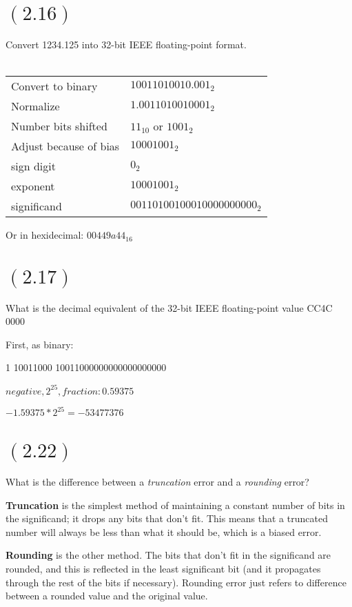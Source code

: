 \documentclass[letterpaper,12pt,titlepage]{article}
\begin{document}
\newpage
\section*{$(2.16)$} 
Convert 1234.125 into 32-bit IEEE floating-point format.\\ 
\\
\begin{center}
\begin{tabular}{ p{6cm} | l}
Convert to binary		& $10011010010.001_2$ 		\\
Normalize 				& $1.0011010010001_2$ 		\\
Number bits shifted		& $11_10$ or $1001_2$ 	\\
Adjust because of bias	& $10001001_2$ \\
\hline	\hline
sign digit 				& $0_2$ \\
exponent 				& $10001001_2$ \\
significand 			& $00110100100010000000000_2$ \\
\end{tabular}
\end{center}

Or in hexidecimal: $00449a44_{16}$ 

\section*{$(2.17)$} What is the decimal equivalent of the 32-bit IEEE floating-point value CC4C 0000
  
First, as binary:

1 10011000 10011000000000000000000

$ negative, 2^{25}, fraction: 0.59375 $ 

$ -1.59375 * 2^{25} = -53477376 $

\section*{$(2.22)$} What is the difference between a \textit{truncation} error and a \textit{rounding} error? 
  
\textbf{Truncation} is the simplest method of maintaining a constant number of bits in the significand; it drops any bits that don't fit. This means that a truncated number will always be less than what it should be, which is a biased error.

\textbf{Rounding} is the other method. The bits that don't fit in the significand are rounded, and this is reflected in the least significant bit (and it propagates through the rest of the bits if necessary). Rounding error just refers to difference between a rounded value and the original value.
\cite[p.78-79]{Clements}
\end{document}
